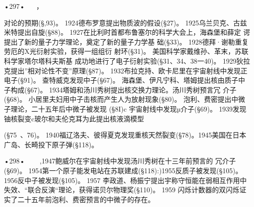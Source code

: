 •297•
  
，
 

对论的预期(§,93)。
1924德布罗意提出物质波的假设(§27)。
1925乌兰贝克、古兹米特提出自旋(§88)。
1927在比利时首都布鲁塞尔的科学大会上，海森堡和薛定
谔提出了新的量子力学理论，奠定了新的量子力学基
础(§33)。
1928德拜·谢勒重复劳厄的X光衍射实验，获得一组组衍
射环(§31)。
美国科学家戴维孙、革末，苏联科学家塔尔塔科夫斯基
成功地进行了电子衍射实验(§31、34、38一40)。
1929狄拉克提出”相对论性不变”原理(§87)。
1932布拉克持、欧卡尼里在宇宙射线中发现正电子(§91)。
查特威克发现中子(§67)。
海森堡、伊凡宁科、塔姆提出核由质子中子构成(§67)。
1934塔姆和汤川秀树提出核交换力理论。汤川秀树预言冗
介子(§68)。
小居里夫妇用中子击核而产生人为放射现象(§80)。
泡利、费密提出中微子理论，二十五年后中微子被发现
(§8I)c
宇宙射线中发现µ介子(§69)。
1939发现铀核裂变c玻尔和夫伦克耳为此提出核液滴模型

(§75~、76)。
1940福辽洛夫、彼得夏克发现重核天然裂变(§78)。1945美国在日本广岛、长畸投下原子弹(§118)。

•298•
  
~,1947鲍威尔在宇宙射线中发现汤川秀树在十三年前预言的
冗介子(§69)。
1954第一个原子能发电站在苏联建成(§118):)1955反质子被发现(§105)。
1956反中子被发现(§105)。
	1957	李政道、杨振宁提出宇称守恒能在弱相互作用中失效、“联合反演“理论，获得诺贝尔物理奖(§110)。
	1959	闪烁计数器的双闪烁证实了二十五年前泡利、费密预言的中微子的存在。

